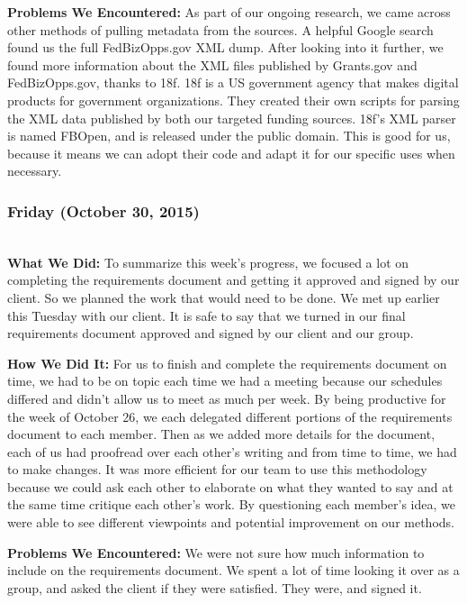 \documentclass[onecolumn]{IEEEtran}
\begin{document}
    \textbf{Problems We Encountered: } 
    As part of our ongoing research, we came across other methods of pulling metadata from the sources. A helpful Google search found us the full FedBizOpps.gov XML dump. After looking into it further, we found more information about the XML files published by Grants.gov and FedBizOpps.gov, thanks to 18f. 18f is a US government agency that makes digital products for government organizations. They created their own scripts for parsing the XML data published by both our targeted funding sources. 18f's XML parser is named FBOpen, and is released under the public domain. This is good for us, because it means we can adopt their code and adapt it for our specific uses when necessary.  

\subsubsection{Friday (October 30, 2015)} \hspace*{\fill} \\  
    \textbf{What We Did: }
    To summarize this week's progress, we focused a lot on completing the requirements document and getting it approved and signed by our client. So we planned the work that would need to be done. We met up earlier this Tuesday with our client. It is safe to say that we turned in our final requirements document approved and signed by our client and our group.  
    
    \textbf{How We Did It: } 
    For us to finish and complete the requirements document on time, we had to be on topic each time we had a meeting because our schedules differed and didn't allow us to meet as much per week. By being productive for the week of October 26, we each delegated different portions of the requirements document to each member. Then as we added more details for the document, each of us had proofread over each other's writing and from time to time, we had to make changes. It was more efficient for our team to use this methodology because we could ask each other to elaborate on what they wanted to say and at the same time critique each other's work. By questioning each member's idea, we were able to see different viewpoints and potential improvement on our methods.  
    
    \textbf{Problems We Encountered: } 
    We were not sure how much information to include on the requirements document. We spent a lot of time looking it over as a group, and asked the client if they were satisfied. They were, and signed it.  
\end{document}
